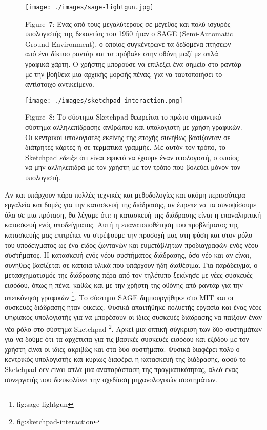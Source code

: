\documentclass[
]{article}
\begin{document}
\leavevmode{}%
\begin{figure}
\hypertarget{fig:sage-lightgun}{%
\centering
\texttt{[image: ./images/sage-lightgun.jpg]}
\caption{Figure~7: Ένας από τους μεγαλύτερους σε μέγεθος και πολύ
ισχυρός υπολογιστής της δεκαετίας του 1950 ήταν ο SAGE (Semi-Automatic
Ground Environment), ο οποίος συγκέντρωνε τα δεδομένα πτήσεων από ένα
δίκτυο ραντάρ και τα πρόβαλε στην οθόνη μαζί με απλά γραφικά χάρτη. Ο
χρήστης μπορούσε να επιλέξει ένα σημείο στο ραντάρ με την βοήθεια μια
αρχικής μορφής πένας, για να ταυτοποιήσει το αντίστοιχο
αντικείμενο.}\label{fig:sage-lightgun}
}
\end{figure}

\leavevmode{}%
\begin{figure}
\hypertarget{fig:sketchpad-interaction}{%
\centering
\texttt{[image: ./images/sketchpad-interaction.png]}
\caption{Figure~8: Το σύστημα Sketchpad θεωρείται το πρώτο σημαντικό
σύστημα αλληλεπίδρασης ανθρώπου και υπολογιστή με χρήση γραφικών. Οι
κεντρικοί υπολογιστές εκείνής της εποχής συνήθως βασίζονταν σε διάτρητες
κάρτες ή σε τερματικά γραμμής. Με αυτόν τον τρόπο, το Sketchpad έδειξε
ότι είναι εφικτό να έχουμε έναν υπολογιστή, ο οποίος να μην αλληλεπιδρά
με τον χρήστη με τον τρόπο που βολεύει μόνον τον
υπολογιστή.}\label{fig:sketchpad-interaction}
}
\end{figure}

Αν και υπάρχουν πάρα πολλές τεχνικές και μεθοδολογίες και ακόμη
περισσότερα εργαλεία και δομές για την κατασκευή της διάδρασης, αν
έπρεπε να τα συνοψίσουμε όλα σε μια πρόταση, θα λέγαμε ότι: η κατασκευή
της διάδρασης είναι η επαναληπτική κατασκευή ενός υποδείγματος. Αυτή η
επανατοποθέτηση του προβλήματος της κατασκευής μας επιτρέπει να
στρέψουμε την προσοχή μας στη φύση και στον ρόλο του υποδείγματος ως ένα
είδος ζωντανών και ευμετάβλητων προδιαγραφών ενός νέου συστήματος. Η
κατασκευή ενός νέου συστήματος διάδρασης, όσο νέο και αν είναι, συνήθως
βασίζεται σε κάποια υλικά που υπάρχουν ήδη διαθέσιμα. Για παράδειγμα, ο
μετασχηματισμός της διάδρασης πέρα από τον τηλέτυπο ξεκίνησε με νέες
συσκευές εισόδου, όπως η πένα, καθώς και με την χρήστη της οθόνης από
ραντάρ για την απεικόνηση γραφικών \footnote{fig:sage-lightgun}. Το
σύστημα SAGE δημιουργήθηκε στο MIT και οι συσκευές διάδρασης ήταν
οικείες. Φυσικά απαιτήθηκε πολυετής εργασία και ένας νέος ψηφιακός
υπολογιστής για να μπορέσουν οι ίδιες συσκευές διάδρασης να παίξουν έναν
νέο ρόλο στο σύστημα Sketchpad \footnote{fig:sketchpad-interaction}.
Αρκεί μια οπτική σύγκριση των δύο συστημάτων για να δούμε ότι τα
αρχέτυπα για τις βασικές συσκευές εισόδου και εξόδου με τον χρήστη είναι
οι ίδιες ακριβώς και στα δύο συστήματα. Φυσικά διαφέρει πολύ ο κεντρικός
υπολογιστής και κυρίως διαφέρει η κατασκευή της διάδρασης, αφού το
Sketchpad δεν είναι απλά μια αναπαράσταση της πραγματικότητας, αλλά ένας
συνεργατής που διευκολύνει την σχεδίαση μηχανολογικών συστημάτων.
\end{document}
